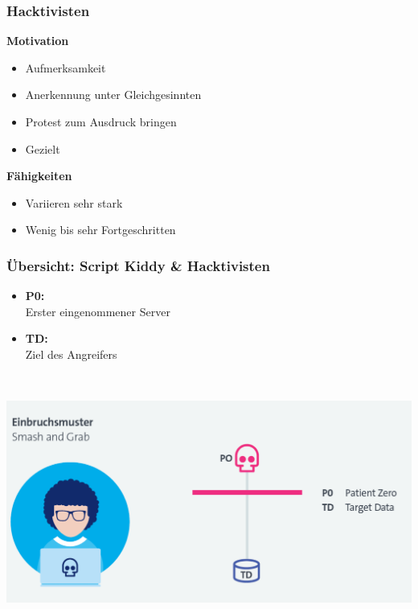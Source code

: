 \subsubsection{Hacktivisten}
\vspace{-8pt}
\begin{multicols*}{2}
    \textbf{Motivation}
    \begin{itemize}
        \item Aufmerksamkeit
        \item Anerkennung unter Gleichgesinnten
        \item Protest zum Ausdruck bringen
        \item Gezielt
    \end{itemize}
    \columnbreak
    \textbf{Fähigkeiten}
    \begin{itemize}
        \item Variieren sehr stark
        \item Wenig bis sehr Fortgeschritten
    \end{itemize}
\end{multicols*}
\vspace{-8pt}


\subsubsection{Übersicht: Script Kiddy \& Hacktivisten}
\begin{minipage}{0.3\linewidth}
    \begin{itemize}
        \item \textbf{P0:}\\ Erster eingenommener Server
        \item \textbf{TD:}\\ Ziel des Angreifers
    \end{itemize}
    \vfill
    $ $
\end{minipage}
\begin{minipage}{0.7\linewidth}
    \begin{center}
        \includegraphics[width=\linewidth]{./img/01_cyber-defense/script_hacktivist}
    \end{center}
\end{minipage}

